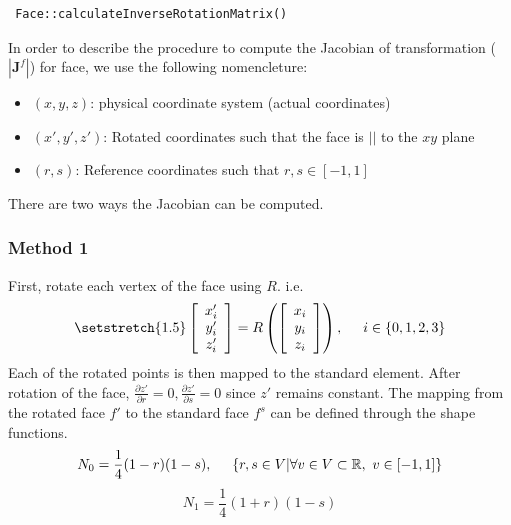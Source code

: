  \begin{verbatim}
 Face::calculateInverseRotationMatrix()
 \end{verbatim}
 In order to describe the procedure to compute the Jacobian of transformation ($|{\mathbf{J}^f}|$) for face,
 we use the following nomencleture:
 \begin{itemize}
	 \item $(x,y,z)$: physical coordinate system (actual coordinates)
	 \item $(x', y', z')$: Rotated coordinates such that the face is $||$ to the $xy$ plane
	 \item $(r,s)$: Reference coordinates such that $r,s \in [-1,1]$
 \end{itemize}
 There are two ways the Jacobian can be computed.

 \subsubsection{Method 1}
 First, rotate each vertex of the face using $R$. 
 i.e.
 \begin{equation}
	 {\setstretch{1.5}
	 \left[\begin{array}{c}
			  x'_i  \\
			  y'_i  \\
			  z'_i \\
	  \end{array} \right] 
	  = 
	  R\left(
	 \left[\begin{array}{c}
			  x_i  \\
			  y_i  \\
			  z_i \\
	  \end{array} \right]
	  \right), \hspace{5mm} i \in \{0,1,2,3\}
  }
 \end{equation}
 Each of the rotated points is then mapped to the standard element.
 After rotation of the face, $\frac{\partial z'}{\partial r} = 0, \frac{\partial z'}{\partial s}=0$ since 
 $z'$ remains constant. 
The mapping from the rotated face $f'$ to the standard face $f^s$ can be defined through the shape functions. 
\begin{equation}\label{shape0f}
	N_0 = \frac{1}{4} (1-r) (1-s) , \hspace{5mm} \{r,s \in V | \forall v \in V \subset {\mathbb{R}}  , ~ v \in [-1,1]\}
\end{equation}
\begin{equation}\label{shape1f}
	N_1 = \frac{1}{4} (1+r) (1-s) 
\end{equation}
